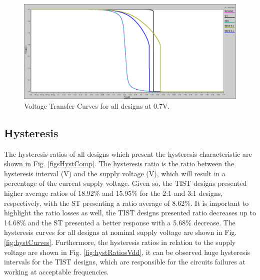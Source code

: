 \documentclass[pgmicro,mestrado,english]{iiufrgs}
\begin{document}
        \begin{figure}[]
        \centering
            \includegraphics[width=1\textwidth, trim={0cm 0cm 0cm 0cm}, clip]{vtcs07.png}
            \caption{Voltage Transfer Curves for all designs at 0.7V.}
        \label{fig:vtcs07}
    \end{figure}

\subsection{Hysteresis}

    The hysteresis ratios of all designs which present the hysteresis characteristic are shown in Fig. \ref{figsHystComp}. The hysteresis ratio is the ratio between the hysteresis interval (V) and the supply voltage (V), which will result in a percentage of the current supply voltage. Given so, the TIST designs presented higher average ratios of 18.92\% and 15.95\% for the 2:1 and 3:1 designs, respectively, with the ST presenting a ratio average of 8.62\%. It is important to highlight the ratio losses as well, the TIST designs presented ratio decreases up to 14.68\% and the ST presented a better response with a 5.68\% decrease. The hysteresis curves for all designs at nominal supply voltage are shown in Fig. \ref{fig:hystCurves}. Furthermore, the hysteresis ratios in relation to the supply voltage are shown in Fig. \ref{fig:hystRatiosVdd}, it can be observed huge hysteresis intervals for the TIST designs, which are responsible for the circuits failures at working at acceptable frequencies.


\end{document}
